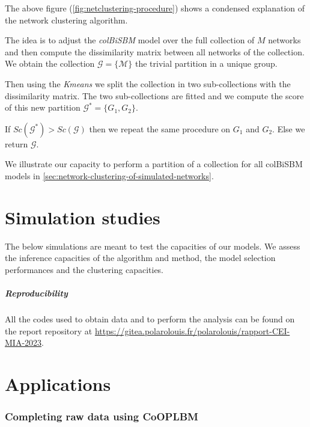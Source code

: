 \documentclass[12pt,a4paper]{report}
\begin{document}
The above figure (\ref{fig:netclustering-procedure}) shows a condensed
explanation of the network clustering algorithm.

The idea is to adjust the \emph{colBiSBM} model over the full collection of $M$
networks and then compute the dissimilarity matrix between all networks of the
collection. We obtain the collection $\mathcal{G} = \{\mathcal{M}\}$ the trivial
partition in a unique group.

Then using the \emph{Kmeans} we split the collection in two sub-collections with
the dissimilarity matrix. The two sub-collections are fitted and we compute
the score of this new partition $\mathcal{G}^{*} = \{G_1, G_2\}$.

If $Sc(\mathcal{G}^{*}) > Sc(\mathcal{G})$ then we repeat the same procedure on
$G_1$ and $G_2$. Else we return $\mathcal{G}$.

We illustrate our capacity to perform a partition of a collection for all
colBiSBM models in \ref{sec:network-clustering-of-simulated-networks}.

\chapter{Simulation studies}\label{chap:simulation-studies}

The below simulations are meant to test the capacities of our models.
We assess the inference capacities of the algorithm and method, the model
selection performances and the clustering capacities.

\paragraph{Reproducibility} All the codes used to obtain data and to perform the
analysis can be found on the report repository at
\url{https://gitea.polarolouis.fr/polarolouis/rapport-CEI-MIA-2023}.





\chapter{Applications}

% 
\subsection{Completing raw data using CoOPLBM \parencite{anakokDisentanglingStructureEcological2022}}



\printbibliography
\listoffigures
\listoftables
\end{document}
